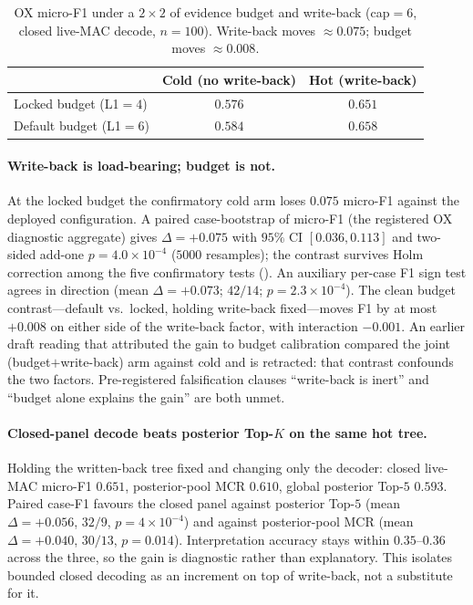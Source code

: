 \begin{table}[t]
\centering
\small
\caption{OX micro-F1 under a $2{\times}2$ of evidence budget and write-back (cap${=}6$, closed live-MAC decode, $n{=}100$). Write-back moves ${\approx}0.075$; budget moves ${\approx}0.008$.}
\label{tab:state-2x2}
\begin{tabular}{lcc}
\toprule
 & Cold (no write-back) & Hot (write-back) \\
\midrule
Locked budget (L1${=}4$) & $0.576$ & $\mathbf{0.651}$ \\
Default budget (L1${=}6$) & $0.584$ & $0.658$ \\
\bottomrule
\end{tabular}
\end{table}

\paragraph{Write-back is load-bearing; budget is not.}
At the locked budget the confirmatory cold arm loses $0.075$ micro-F1 against the deployed configuration.
A paired case-bootstrap of micro-F1 (the registered OX diagnostic aggregate) gives $\Delta{=}{+}0.075$ with $95\%$ CI $[0.036,0.113]$ and two-sided add-one $p{=}4.0{\times}10^{-4}$ ($5000$ resamples); the contrast survives Holm correction among the five confirmatory tests ().
An auxiliary per-case F1 sign test agrees in direction (mean $\Delta{=}{+}0.073$; $42/14$; $p{=}2.3{\times}10^{-4}$).
The clean budget contrast---default vs.\ locked, holding write-back fixed---moves F1 by at most ${+}0.008$ on either side of the write-back factor, with interaction $-0.001$.
An earlier draft reading that attributed the gain to budget calibration compared the joint (budget${+}$write-back) arm against cold and is retracted: that contrast confounds the two factors.
Pre-registered falsification clauses ``write-back is inert'' and ``budget alone explains the gain'' are both unmet.

\paragraph{Closed-panel decode beats posterior Top-$K$ on the same hot tree.}
Holding the written-back tree fixed and changing only the decoder: closed live-MAC micro-F1 $0.651$, posterior-pool MCR $0.610$, global posterior Top-$5$ $0.593$.
Paired case-F1 favours the closed panel against posterior Top-$5$ (mean $\Delta{=}{+}0.056$, $32/9$, $p{=}4{\times}10^{-4}$) and against posterior-pool MCR (mean $\Delta{=}{+}0.040$, $30/13$, $p{=}0.014$).
Interpretation accuracy stays within $0.35$--$0.36$ across the three, so the gain is diagnostic rather than explanatory.
This isolates bounded closed decoding as an increment on top of write-back, not a substitute for it.

